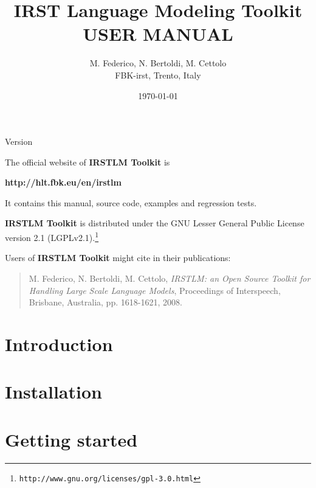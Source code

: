 \documentclass[11pt]{article}
\newcommand{\IRSTLM}{{\bf IRSTLM Toolkit}}
\newcommand*{\MyPath}{../}
\newcommand{\versionnumber}{}
\begin{document}
   

\title{IRST Language Modeling Toolkit \\USER MANUAL}
			         
\author{M. Federico, N. Bertoldi, M. Cettolo\\FBK-irst, Trento, Italy}			       
\date{\today}
 
\maketitle
\centerline{Version \versionnumber}

\vspace*{3cm}
\noindent
The official website of {\IRSTLM} is

\bigskip

{\bf http://hlt.fbk.eu/en/irstlm}

\bigskip
\noindent It contains this manual, source code, examples and regression tests.

\vspace*{1cm}
\noindent
{\IRSTLM} is distributed under the GNU Lesser General Public License version 2.1 (LGPLv2.1).\footnote{\tt http://www.gnu.org/licenses/gpl-3.0.html}

\vspace*{1cm}
\noindent
Users of {\IRSTLM}  might cite in their publications:
\begin{quote}
M. Federico,  N. Bertoldi,  M. Cettolo, {\em IRSTLM: an Open Source Toolkit for Handling Large Scale Language Models}, Proceedings of Interspeech, Brisbane, Australia, pp. 1618-1621, 2008.
\end{quote}



\newpage
\setcounter{tocdepth}{2}  
\tableofcontents


\newpage
\section{Introduction}
\label{sec:introduction}



\newpage
\section{Installation}
\label{sec:installation}


\newpage
\section{Getting started}
\label{sec:gettingStarted}

\end{document}
